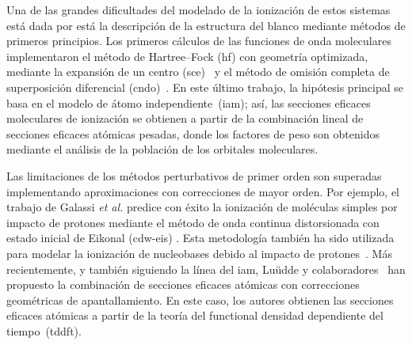 Una de las grandes dificultades del modelado de la ionización de estos 
sistemas está dada por está la descripción de la estructura del blanco
mediante métodos de primeros principios. Los primeros cálculos de las 
funciones de onda moleculares implementaron el método de Hartree--Fock
(\acs{hf}) con geometría optimizada, mediante la expansión de un centro 
(\acs{sce})~\cite{DalCappello:08} y el método de omisión completa de 
superposición diferencial (\acs{cndo})~\cite{Champion:10}. En este último 
trabajo, la hipótesis principal se basa en el modelo de átomo 
independiente~(\acs{iam}); así, las secciones eficaces moleculares de 
ionización se obtienen a partir de la combinación lineal de secciones 
eficaces atómicas pesadas, donde los factores de peso son obtenidos 
mediante el análisis de la población de los orbitales moleculares. 

Las limitaciones de los métodos perturbativos de primer orden son 
superadas implementando aproximaciones con correcciones de mayor orden. 
Por ejemplo, el trabajo de Galassi \textit{et al.} \cite{Galassi:00} 
predice con éxito la ionización de moléculas simples por impacto de 
protones mediante el método de onda continua distorsionada con estado 
inicial de Eikonal (\acs{cdw-eis}) \cite{Fainstein:88,Miraglia:08,
Miraglia:09}. Esta metodología también ha sido utilizada para modelar la 
ionización de nucleobases debido al impacto de protones~\cite{Galassi:12}.
Más recientemente, y también siguiendo la línea del \acs{iam}, Lu\"udde 
y colaboradores~\cite{Ludde:16,Ludde:18,Ludde:19,Ludde:20} han propuesto 
la combinación de secciones eficaces atómicas con correcciones 
geométricas de apantallamiento. En este caso, los autores obtienen las 
secciones eficaces atómicas a partir de la teoría del functional densidad 
dependiente del tiempo~(\acs{tddft}). 

